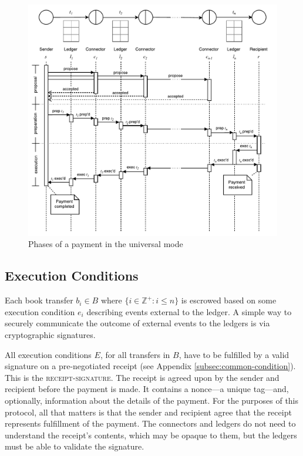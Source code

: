 \documentclass[letterpaper,twocolumn,10pt]{article}
\begin{document}
\begin{figure}[h]
    \centering
    \includegraphics[width=\textwidth]{figures/universal-sequence.pdf}
    \caption{Phases of a payment in the universal mode}
    \label{fig:sequence}
\end{figure}

\subsection{Execution Conditions}

Each book transfer $b_i \in B$ where 
$ \{ i \in \mathbb{Z}^+ : i \leq n \} $ is escrowed based on some execution condition $e_i$ describing events external to the ledger. A simple way to securely communicate the outcome of external events to the ledgers is via cryptographic signatures.

All execution conditions $E$, for all transfers in $B$, have to be fulfilled by a valid signature on a pre-negotiated receipt (see Appendix \ref{subsec:common-condition}). This is the \textsc{receipt-signature}. The receipt is agreed upon by the sender and recipient before the payment is made. It contains a nonce---a unique tag---and, optionally, information about the details of the payment. For the purposes of this protocol, all that matters is that the sender and recipient agree that the receipt represents fulfillment of the payment. The connectors and ledgers do not need to understand the receipt's contents, which may be opaque to them, but the ledgers must be able to validate the signature.
\end{document}
